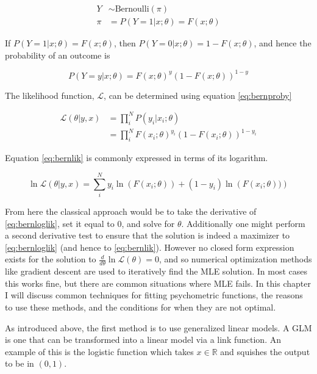 \documentclass[11pt, oneside, openany]{scrbook}
\begin{document}
\begin{align*}
Y &\sim \textrm{Bernoulli}(\pi) \\
\pi &= P(Y=1 \vert x; \theta) = F(x; \theta)
\end{align*}

If \(P(Y=1 | x; \theta) = F(x;\theta)\), then \(P(Y = 0 | x; \theta) = 1 - F(x;\theta)\), and hence the probability of an outcome is

\begin{equation}
  P(Y=y | x; \theta) = F(x;\theta)^y(1-F(x;\theta))^{1-y}
  \label{eq:bernproby}
\end{equation}

The likelihood function, \(\mathcal{L}\), can be determined using equation \eqref{eq:bernproby}

\begin{equation}
  \begin{split}
    \mathcal{L}(\theta | y, x) &= \prod_{i}^{N} P(y_i | x_i; \theta) \\
    &= \prod_{i}^{N}F(x_i;\theta)^{y_i}(1-F(x_i;\theta))^{1-y_i}
  \end{split}
  \label{eq:bernlik}
\end{equation}

Equation \eqref{eq:bernlik} is commonly expressed in terms of its logarithm.

\begin{equation}
  \ln \mathcal{L}(\theta | y, x) = \sum_{i}^{N} y_i \ln\left(F(x_i;\theta)\right) + (1-y_i) \ln\left(F(x_i;\theta))\right)
  \label{eq:bernloglik}
\end{equation}

From here the classical approach would be to take the derivative of \eqref{eq:bernloglik}, set it equal to \(0\), and solve for \(\theta\). Additionally one might perform a second derivative test to ensure that the solution is indeed a maximizer to \eqref{eq:bernloglik} (and hence to \eqref{eq:bernlik}). However no closed form expression exists for the solution to \(\frac{d}{d\theta} \ln \mathcal{L}(\theta) = 0\), and so numerical optimization methods like gradient descent are used to iteratively find the MLE solution. In most cases this works fine, but there are common situations where MLE fails. In this chapter I will discuss common techniques for fitting psychometric functions, the reasons to use these methods, and the conditions for when they are not optimal.

As introduced above, the first method is to use generalized linear models. A GLM is one that can be transformed into a linear model via a link function. An example of this is the logistic function which takes \(x \in \mathbb{R}\) and squishes the output to be in \((0, 1)\).
\end{document}
